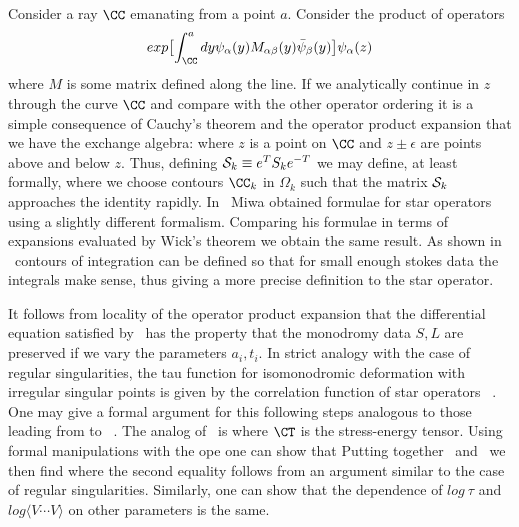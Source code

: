 Consider a ray $\CC$ emanating from a point $a$. Consider the product 
of operators 
$$exp\bigl[\int^a_\CC dy\psi_\alpha(y) M_{\alpha\beta}(y)\bar\psi_\beta(y)
\bigr]\psi_\alpha(z)$$
where $M$ is some matrix defined along the line. 
If we analytically continue in $z$ through 
the curve $\CC$ and compare with the other operator ordering 
it is a simple consequence of Cauchy's theorem and the 
operator product expansion that we have the exchange algebra:
\eqn{}
where $z$ is a point on $\CC$ and $z\pm\epsilon$ are points above and 
below $z$. Thus, defining ${\cal S}_k\equiv e^T S_k e^{-T}$ we may define, 
at least formally, 
\eqn{}
where we choose contours $\CC_k$ in $\Omega_k$ such that the 
matrix ${\cal S}_k$ approaches the identity rapidly. 
In \miwai\ Miwa obtained formulae for star operators using 
a slightly different formalism. Comparing his formulae in 
terms of expansions evaluated by Wick's theorem we 
obtain the same result.
As shown in \miwai\ contours of integration can be defined so 
that for small enough stokes data the integrals make 
sense, thus giving a more precise definition to the star 
operator.

It follows from locality of the operator product 
expansion that the differential equation 
satisfied by \corstar\ has the property that the monodromy
data $S,L$ are preserved if we vary the parameters $a_i,t_i$. 
In strict analogy with the case of regular singularities,
the tau function for 
isomonodromic deformation with irregular singular
points
is given by the correlation function
of star operators \miwai\ . One may give a formal 
argument for this following steps analogous to those 
leading from \corrii to \sqaring\ . The analog of \corrii\ is
\eqn{}
where $\CT$ is the stress-energy tensor.
Using formal manipulations with the ope one can show that
\eqn{}
Putting together \stress\ and \gobpe\ we then find
\eqn{}
where the second equality follows from an argument similar to 
the case of regular singularities. Similarly, one can show
that the dependence
of $log~\tau$ and $log\langle V\cdots V\rangle$ on other 
parameters is the same.

